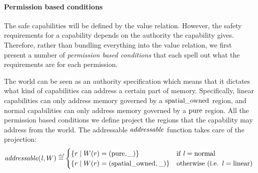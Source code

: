 \begin{jversion}

\paragraph{Permission based conditions}
\label{par:perm-cond}
The safe capabilities will be defined by the value relation.
However, the safety requirements for a capability depends on the authority the capability gives.
Therefore, rather than bundling everything into the value relation, we first present a number of \emph{permission based conditions} that each spell out what the requirements are for each permission.

The world can be seen as an authority specification which means that it dictates what kind of capabilities can address a certain part of memory.
Specifically, linear capabilities can only address memory governed by a $\mathrm{spatial\_owned}$ region, and normal capabilities can only address memory governed by a $\mathrm{pure}$ region.
All the permission based conditions we define project the regions that the capability may address from the world.
The addressable $\addressable{}$ function takes care of the projection:
\[
  \addressable{\lin,W} \defeq
  \begin{cases}
    \{ r \mid W(r) = (\pure,\_) \} & \text{if $\lin = \normal$} \\
    \{ r \mid W(r) = (\spatialo,\_) \}  & \text{otherwise (i.e. $\lin = \linear$)} \\
  \end{cases}
\]


\end{jversion}
